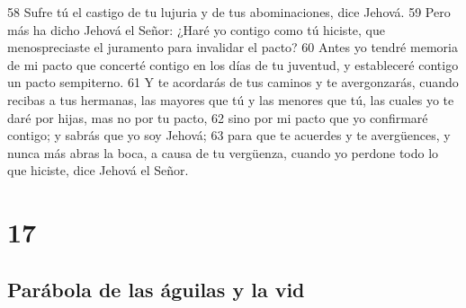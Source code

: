 58 Sufre tú el castigo de tu lujuria y de tus abominaciones, dice Jehová.
59 Pero más ha dicho Jehová el Señor: ¿Haré yo contigo como tú hiciste, que menospreciaste el juramento para invalidar el pacto?
60 Antes yo tendré memoria de mi pacto que concerté contigo en los días de tu juventud, y estableceré contigo un pacto sempiterno.
61 Y te acordarás de tus caminos y te avergonzarás, cuando recibas a tus hermanas, las mayores que tú y las menores que tú, las cuales yo te daré por hijas, mas no por tu pacto,
62 sino por mi pacto que yo confirmaré contigo; y sabrás que yo soy Jehová;
63 para que te acuerdes y te avergüences, y nunca más abras la boca, a causa de tu vergüenza, cuando yo perdone todo lo que hiciste, dice Jehová el Señor.

\chapter{17}

\section*{Parábola de las águilas y la vid }

